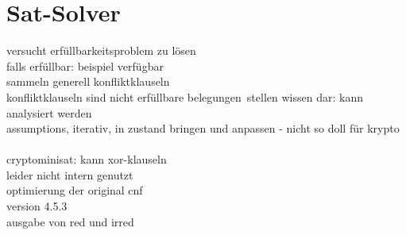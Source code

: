 \section{Sat-Solver}
\label{sec:satsolver}


versucht erfüllbarkeitsproblem zu lösen\\
falls erfüllbar: beispiel verfügbar\\
sammeln generell konfliktklauseln\\
konfliktklauseln sind nicht erfüllbare belegungen\
stellen wissen dar: kann analysiert werden\\
assumptions, iterativ, in zustand bringen und anpassen - nicht so doll für krypto\\
~\\
cryptominisat: kann xor-klauseln\\
leider nicht intern genutzt\\
optimierung der original cnf\\
version 4.5.3\\
ausgabe von red und irred\\